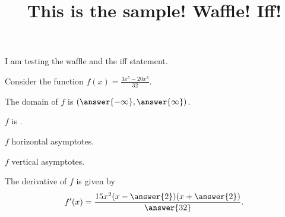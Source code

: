 \documentclass{ximera}
\title[Breal-grond]{This is the sample! Waffle!  Iff!}
\begin{document}

I am testing the waffle and the iff statement.




\begin{exercise}

Consider the function $f(x) = \frac{3x^5-20x^3}{32}$.

The domain of $f$ is $\left(\answer{-\infty},\answer{\infty}\right)$.

$f$ is .

$f$  horizontal asymptotes.

$f$  vertical asymptotes.

The derivative of $f$ is given by
\[
f'(x) =\frac{15x^2(x- \answer{2})(x+ \answer{2})}{\answer{32}}.
\]

\end{exercise}
\end{document}
